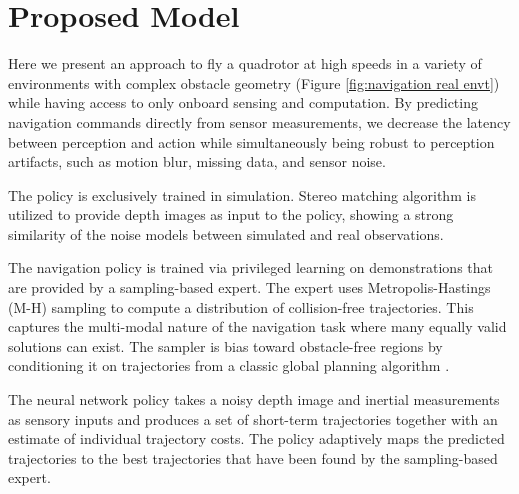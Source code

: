 \section{Proposed Model}
Here we present an approach to fly a quadrotor at high speeds in
a variety of environments with complex obstacle geometry (Figure \ref{fig:navigation real envt}) while having access to only onboard sensing and computation. By predicting navigation commands directly from sensor
measurements, we decrease the latency between perception and action while simultaneously being robust to perception artifacts, such
as motion blur, missing data, and sensor noise. 

The policy is exclusively trained in simulation. Stereo matching algorithm \cite{stereoMatching} is utilized to provide depth images as input
to the policy, showing a strong similarity of the noise models between simulated and real observations.

The navigation policy is trained via privileged learning on
demonstrations that are provided by a sampling-based expert. The expert
uses Metropolis-Hastings \cite{MH_hasting} (M-H) sampling to compute a distribution of collision-free trajectories. This captures the multi-modal nature of the navigation task where many equally valid solutions can exist. The sampler is bias toward obstacle-free regions by conditioning it on trajectories from a classic global planning algorithm \cite{global_planning}.

The neural network policy takes a noisy depth image and inertial measurements as sensory inputs and produces a set of short-term trajectories together with an estimate of individual trajectory costs. The policy
adaptively maps the predicted trajectories to the best trajectories that have been found by the sampling-based expert.  

